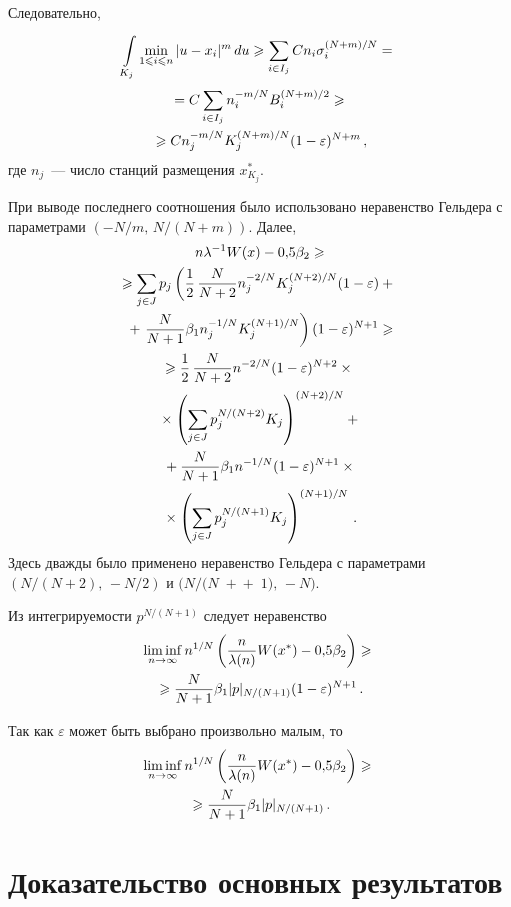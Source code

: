 \begin{multicols}{2}
Следовательно,
\begin{multline*}
\int\limits_{K_j}^{}\min\limits_{1\leqslant i\leqslant n}|u-x_i|^m\,du \geqslant
\sum\limits_{i\in I_j}^{}C n_i \sigma_i^{(N+m)/N}= {}\\
{}=
C\sum\limits_{i\in I_j}^{}n_i^{-m/N}B_i^{(N+m)/2}\geqslant {}\\
{}\geqslant
Cn_j^{-m/N}K_j^{(N+m)/N}(1-\varepsilon)^{N+m}\,,
\end{multline*}
где $n_j$~--- число станций размещения $x_{K_j}^*$.

При выводе последнего соотношения было использовано неравенство Гельдера с параметрами
$(-N/m,\, N/(N+m))$.
Далее,
\begin{multline*}
n\lambda^{-1}W(x)-0{,}5\beta_2\geqslant\\
\geqslant
\sum\limits_{j\in J}^{}p_j \left(\displaystyle\frac{\displaystyle 1\mathstrut}{\displaystyle 2\mathstrut}\,\displaystyle\frac{\displaystyle N\mathstrut}{\displaystyle N+2\mathstrut} n_j^{-2/N}K_j^{(N+2)/N}(1-\varepsilon) +{}\right.\\
{}+\left.
\displaystyle\frac{\displaystyle N\mathstrut}{\displaystyle N+1\mathstrut}\beta_1 n_j^{-1/N}K_j^{(N+1)/N}\right)(1-\varepsilon)^{N+1}\geqslant\\
\geqslant \displaystyle\frac{\displaystyle 1\mathstrut}{\displaystyle 2\mathstrut}\,\displaystyle\frac{\displaystyle N\mathstrut}{\displaystyle N+2\mathstrut}n^{-2/N}(1-\varepsilon)^{N+2}\times{}\\
{}\times \left(
\sum\limits_{j\in J}^{}p_j^{N/(N+2)}K_j\right)^{(N+2)/N} +{}\\
{}
+\displaystyle\frac{\displaystyle N\mathstrut}{\displaystyle N+1\mathstrut}\beta_1 n^{-1/N}(1-\varepsilon)^{N+1}\times{}\\
{}\times \left( \sum\limits_{j\in
J}^{}p_j^{N/(N+1)}K_j\right)^{(N+1)/N}\,.
\end{multline*}
Здесь дважды было применено неравенство Гельдера с параметрами
$(N/(N+2),\,-N/2)$ и
$(N/(N\;+{}$\linebreak ${}+\;1),\,-N)$.

Из интегрируемости $p^{N/(N+1)}$ следует неравенство
\begin{multline*}
\liminf\limits_{n\rightarrow
\infty}n^{1/N}\left(\displaystyle\frac{\displaystyle n\mathstrut}{\displaystyle \lambda(n)\mathstrut}W(x^*)-0{,}5\beta_2\right)\geqslant{}\\
{}\geqslant
\displaystyle\frac{\displaystyle N\mathstrut}{\displaystyle N+1\mathstrut} \beta_1 |p|_{N/(N+1)}(1-\varepsilon)^{N+1}\,.
\end{multline*}

Так как $\varepsilon$ может быть выбрано произвольно малым, то
\begin{multline*}
\liminf\limits_{n\rightarrow
\infty}n^{1/N}\left(\displaystyle\frac{\displaystyle n\mathstrut}{\displaystyle \lambda(n)\mathstrut}W(x^*)-0{,}5\beta_2\right)\geqslant{}\\
{}\geqslant
\displaystyle\frac{\displaystyle N\mathstrut}{\displaystyle N+1\mathstrut} \beta_1 |p|_{N/(N+1)}\,.
\end{multline*}

\section{Доказательство основных результатов}


\end{multicols}
